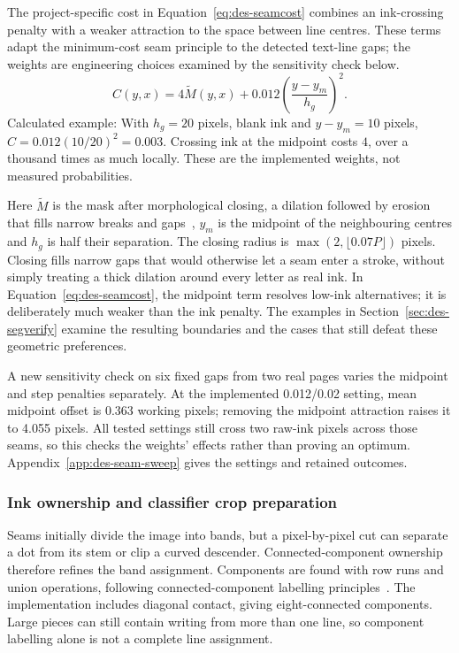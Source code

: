 The project-specific cost in Equation~\ref{eq:des-seamcost} combines an ink-crossing penalty with a weaker attraction to the space between line centres. These terms adapt the minimum-cost seam principle to the detected text-line gaps; the weights are engineering choices examined by the sensitivity check below.
\begin{equation}
C(y,x)=4\widetilde M(y,x)
+0.012\left(\frac{y-y_m}{h_g}\right)^2.
\label{eq:des-seamcost}
\end{equation}
Calculated example: With $h_g=20$ pixels, blank ink and $y-y_m=10$ pixels, $C=0.012(10/20)^2=0.003$. Crossing ink at the midpoint costs $4$, over a thousand times as much locally. These are the implemented weights, not measured probabilities.

Here $\widetilde M$ is the mask after morphological closing, a dilation followed by erosion that fills narrow breaks and gaps~\cite[p.~541, Def.~36]{haralick1987}, $y_m$ is the midpoint of the neighbouring centres and $h_g$ is half their separation. The closing radius is $\max(2,\lfloor0.07P\rfloor)$ pixels. Closing fills narrow gaps that would otherwise let a seam enter a stroke, without simply treating a thick dilation around every letter as real ink. In Equation~\ref{eq:des-seamcost}, the midpoint term resolves low-ink alternatives; it is deliberately much weaker than the ink penalty. The examples in Section~\ref{sec:des-segverify} examine the resulting boundaries and the cases that still defeat these geometric preferences.

A new sensitivity check on six fixed gaps from two real pages varies the midpoint and step penalties separately. At the implemented 0.012/0.02 setting, mean midpoint offset is 0.363 working pixels; removing the midpoint attraction raises it to 4.055 pixels. All tested settings still cross two raw-ink pixels across those seams, so this checks the weights' effects rather than proving an optimum. Appendix~\ref{app:des-seam-sweep} gives the settings and retained outcomes.

\subsubsection{Ink ownership and classifier crop preparation}
Seams initially divide the image into bands, but a pixel-by-pixel cut can separate a dot from its stem or clip a curved descender. Connected-component ownership therefore refines the band assignment. Components are found with row runs and union operations, following connected-component labelling principles~\cite[pp.~476--479]{rosenfeld1966}. The implementation includes diagonal contact, giving eight-connected components. Large pieces can still contain writing from more than one line, so component labelling alone is not a complete line assignment.

